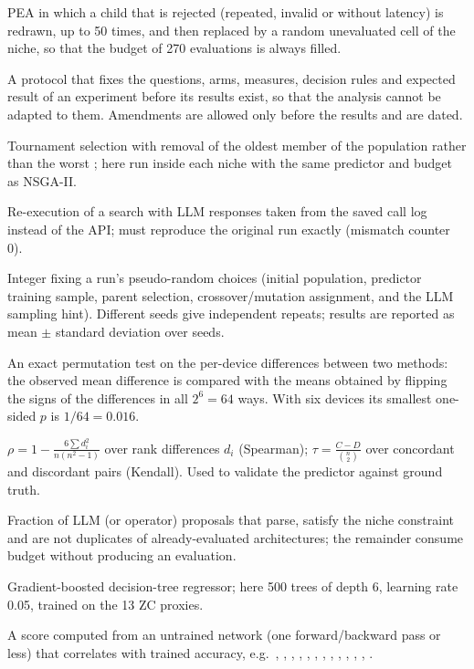 \begin{description}[style=nextline,leftmargin=0pt,itemsep=3pt]
\item[PEA with refilling.] PEA in which a child that is rejected (repeated, invalid or without latency) is redrawn, up to 50 times, and then replaced by a random unevaluated cell of the niche, so that the budget of 270 evaluations is always filled.

\item[Pre-registration.] A protocol that fixes the questions, arms, measures, decision rules and expected result of an experiment before its results exist, so that the analysis cannot be adapted to them. Amendments are allowed only before the results and are dated.

\item[Regularised (aging) evolution.] Tournament selection with removal of the oldest member of the population rather than the worst \cite{real19}; here run inside each niche with the same predictor and budget as NSGA-II.

\item[Replay.] Re-execution of a search with LLM responses taken from the saved call log instead of the API; must reproduce the original run exactly (mismatch counter 0).

\item[Seed.] Integer fixing a run's pseudo-random choices (initial population, predictor training sample, parent selection, crossover/mutation assignment, and the LLM sampling hint). Different seeds give independent repeats; results are reported as mean $\pm$ standard deviation over seeds.

\item[Sign-flip test.] An exact permutation test on the per-device differences between two methods: the observed mean difference is compared with the means obtained by flipping the signs of the differences in all $2^6=64$ ways. With six devices its smallest one-sided $p$ is $1/64=0.016$.

\item[Spearman / Kendall rank correlation.] $\rho=1-\frac{6\sum d_i^2}{n(n^2-1)}$ over rank differences $d_i$ (Spearman); $\tau=\frac{C-D}{\binom{n}{2}}$ over concordant and discordant pairs (Kendall). Used to validate the predictor against ground truth.

\item[Usable proposal rate.] Fraction of LLM (or operator) proposals that parse, satisfy the niche constraint and are not duplicates of already-evaluated architectures; the remainder consume budget without producing an evaluation.

\item[XGBoost.] Gradient-boosted decision-tree regressor; here 500 trees of depth 6, learning rate 0.05, trained on the 13 ZC proxies.

\item[Zero-cost (ZC) proxy.] A score computed from an untrained network (one forward/backward pass or less) that correlates with trained accuracy, e.g.\ , , , , , , , , , , , , .
\end{description}
